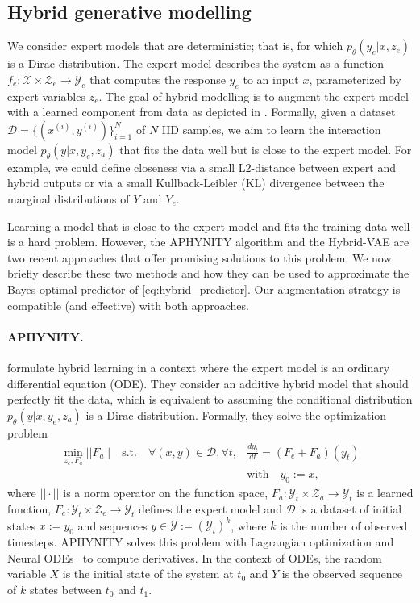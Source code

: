 \subsection{Hybrid generative modelling}
We consider expert models that are deterministic; that is, for which $p_\theta(y_e|x, z_e)$ is a Dirac distribution. The expert model describes the system as a function $f_e : \mathcal{X} \times \mathcal{Z}_e \rightarrow \mathcal{Y}_e$ that computes the response $y_e$ to an input $x$, parameterized by expert variables $z_e$. The goal of hybrid modelling is to augment the expert model with a learned component from data as depicted in . Formally, given a dataset $\mathcal{D} = \{(x^{(i)}, y^{(i)})\}_{i=1}^N$ of $N$ IID samples, we aim to learn the interaction model $p_\theta(y|x, y_e, z_a)$ that fits the data well but is close to the expert model. For example, we could define closeness via a small L2-distance between expert and hybrid outputs or via a small Kullback-Leibler (KL) divergence between the marginal distributions of $Y$ and $Y_e$.

Learning a model that is close to the expert model and fits the training data well is a hard problem. However, the APHYNITY algorithm \citep{APHYNITY} and the Hybrid-VAE \citep[][HVAE]{HVAE} are two recent approaches that offer promising solutions to this problem. We now briefly describe these two methods and how they can be used to approximate the Bayes optimal predictor of \eqref{eq:hybrid_predictor}. Our augmentation strategy is compatible (and effective) with both approaches.
\paragraph{APHYNITY.}
\citet{APHYNITY} formulate hybrid learning in a context where the expert model is an ordinary differential equation (ODE). They consider an additive hybrid model that should perfectly fit the data, which is equivalent to assuming the conditional distribution $p_\theta(y|x, y_e, z_a)$ is a Dirac distribution. Formally, they solve the optimization problem
\begin{align}
    \min_{z_e, F_a} ||F_a|| \quad \text{s.t.} \quad \forall (x, y) \in \mathcal{D}, \forall t,& \frac{dy_t}{dt} = (F_e + F_a)(y_t) \nonumber \\ &\text{with} \quad y_0 := x, \label{eq:APHYNITY}
\end{align}
where $||\cdot||$ is a norm operator on the function space, $F_a: \mathcal{Y}_t \times \mathcal{Z}_a \rightarrow \mathcal{Y}_t$ is a learned function, $F_e: \mathcal{Y}_t \times \mathcal{Z}_e \rightarrow \mathcal{Y}_t$ defines the expert model and $\mathcal{D}$ is a dataset of initial states $x:=y_0$ and sequences $y \in \mathcal{Y} := (\mathcal{Y}_t)^k$, where $k$ is the number of observed timesteps. APHYNITY solves this problem with Lagrangian optimization and Neural ODEs~\citep{NODE} to compute derivatives. In the context of ODEs, the random variable $X$ is the initial state of the system at $t_0$ and $Y$ is the observed sequence of $k$ states between $t_0$ and $t_1$.

